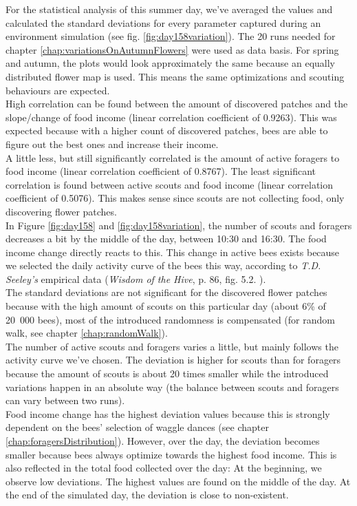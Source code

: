 		For the statistical analysis of this summer day, we've averaged the values and calculated the standard deviations for every parameter captured during an environment simulation (see fig. \ref{fig:day158variation}). The 20 runs needed for chapter \ref{chap:variationsOnAutumnFlowers} were used as data basis. For spring and autumn, the plots would look approximately the same because an equally distributed flower map is used. This means the same optimizations and scouting behaviours are expected.\\
		High correlation can be found between the amount of discovered patches and the slope/change of food income (linear correlation coefficient of 0.9263). This was expected because with a higher count of discovered patches, bees are able to figure out the best ones and increase their income.\\
		A little less, but still significantly correlated is the amount of active foragers to food income (linear correlation coefficient of 0.8767). The least significant correlation is found between active scouts and food income (linear correlation coefficient of 0.5076). This makes sense since scouts are not collecting food, only discovering flower patches.\\
		In Figure \ref{fig:day158} and \ref{fig:day158variation}, the number of scouts and foragers decreases a bit by the middle of the day, between 10:30 and 16:30. The food income change directly reacts to this. This change in active bees exists because we selected the daily activity curve of the bees this way, according to \textit{T.D. Seeley's} empirical data (\textit{Wisdom of the Hive}, p. 86, fig. 5.2. \cite{seeley95}).\\
		
		The standard deviations are not significant for the discovered flower patches because with the high amount of scouts on this particular day (about 6\% of 20~000 bees), most of the introduced randomness is compensated (for random walk, see chapter \ref{chap:randomWalk}).\\
		The number of active scouts and foragers varies a little, but mainly follows the activity curve we've chosen. The deviation is higher for scouts than for foragers because the amount of scouts is about 20 times smaller while the introduced variations happen in an absolute way (the balance between scouts and foragers can vary between two runs).\\
		Food income change has the highest deviation values because this is strongly dependent on the bees' selection of waggle dances (see chapter \ref{chap:foragersDistribution}). However, over the day, the deviation becomes smaller because bees always optimize towards the highest food income. This is also reflected in the total food collected over the day: At the beginning, we observe low deviations. The highest values are found on the middle of the day. At the end of the simulated day, the deviation is close to non-existent.
		
